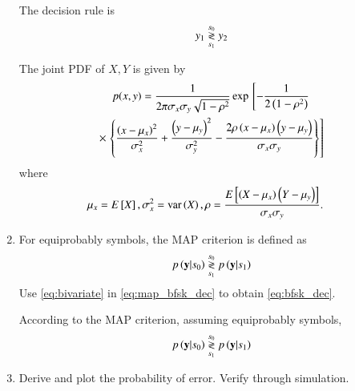 \begin{enumerate}[label=\arabic*.,ref=\thesubsection.\theenumi]
\solution The decision rule is
\begin{equation}
\label{eq:bfsk_dec}
y_1 \overset{s_0}{\underset{s_1}{\gtrless}} y_2
\end{equation}
\begin{definition}
The joint PDF of $X,Y$ is given by
\begin{multline}
\label{eq:bivariate}
p(x,y)= \frac{1}{2\pi \sigma_x\sigma_y\sqrt{1-\rho^2}}\exp{}\left[-\frac{1}{2\left(1-\rho^2\right)}\right.
\\
\times {}\left.\left\{\frac{\left(x-\mu_x\right)^2}{\sigma_x^2}+\frac{\left(y-\mu_y\right)^2}{\sigma_y^2}-\frac{2\rho\left(x-\mu_x\right)\left(y-\mu_y\right)}{\sigma_x\sigma_y}\right\}\right]
\end{multline}
%
where
\begin{align}
\mu_x &= E{}\left[X\right],
\sigma_x^2 = \text{var}\left(X\right),
\rho = \frac{E{}\left[\left(X - \mu_x\right)\left(Y-\mu_y\right)\right]}{\sigma_x\sigma_y}.
\end{align}
%
\end{definition}
%
\item
For equiprobably symbols, the MAP criterion is defined as
%
\begin{equation}
\label{eq:map_bfsk_dec}
p\left(\mathbf{y}|s_0\right) \overset{s_0}{\underset{s_1}{\gtrless}} p\left(\mathbf{y}|s_1\right)
\end{equation}
Use \eqref{eq:bivariate} in \eqref{eq:map_bfsk_dec}  to obtain \eqref{eq:bfsk_dec}.

\solution According to the MAP criterion, assuming equiprobably symbols,
\begin{align}
p\left(\mathbf{y}|s_0\right) \overset{s_0}{\underset{s_1}{\gtrless}} p\left(\mathbf{y}|s_1\right)
\end{align}
\item
Derive and plot the probability of error.  Verify through simulation.


\end{enumerate}
